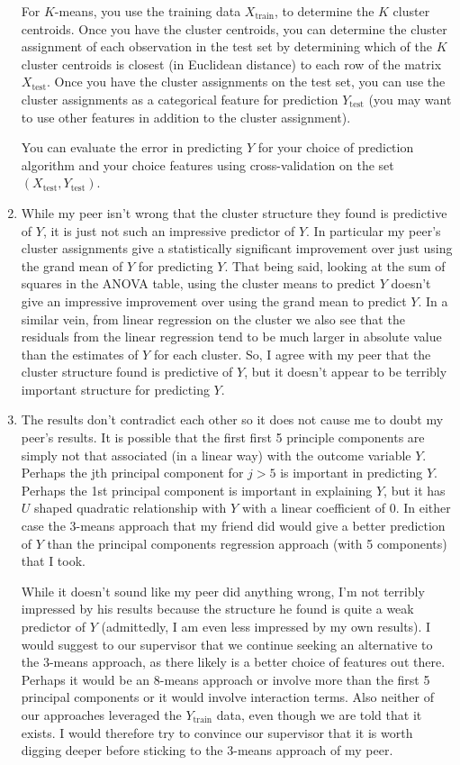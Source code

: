\begin{enumerate}[label=(\alph*)]
For $K$-means, you use the training data $X_{\text{train}}$, to determine the $K$ cluster centroids. Once you have the cluster centroids, you can determine the cluster assignment of each observation in the test set by determining which of the $K$ cluster centroids is closest (in Euclidean distance) to each row of the matrix $X_{\text{test}}$. Once you have the cluster assignments on the test set, you can use the cluster assignments as a categorical feature for prediction $Y_{\text{test}}$ (you may want to use other features in addition to the cluster assignment). 


You can evaluate the error in predicting $Y$ for your choice of prediction algorithm and your choice features using cross-validation on the set $(X_{\text{test}}, Y_{\text{test}})$.


\item While my peer isn't wrong that the cluster structure they found is predictive of $Y$, it is just not such an impressive predictor of $Y$. In particular my peer's cluster assignments give a statistically significant improvement over just using the grand mean of $Y$ for predicting $Y$. That being said, looking at the sum of squares in the ANOVA table, using the cluster means to predict $Y$ doesn't give an impressive improvement over using the grand mean to predict $Y$. In a similar vein, from linear regression on the cluster we also see that the residuals from the linear regression tend to be much larger in absolute value than the estimates of $Y$ for each cluster. So, I agree with my peer that the cluster structure found is predictive of $Y$, but it doesn't appear to be terribly important structure for predicting $Y$.

\item The results don't contradict each other so it does not cause me to doubt my peer's results. It is possible that the first first 5 principle components are simply not that associated (in a linear way) with the outcome variable $Y$. Perhaps the jth principal component for $j>5$ is important in predicting $Y$. Perhaps the 1st principal component is important in explaining $Y$, but it has $U$ shaped quadratic relationship with $Y$ with a linear coefficient of $0$. In either case the 3-means approach that my friend did would give a better prediction of $Y$ than the principal components regression approach (with 5 components) that I took.

While it doesn't sound like my peer did anything wrong, I'm not terribly impressed by his results because the structure he found is quite a weak predictor of $Y$ (admittedly, I am even less impressed by my own results). I would suggest to our supervisor that we continue seeking an alternative to the 3-means approach, as there likely is a better choice of features out there. Perhaps it would be an 8-means approach or involve more than the first 5 principal components or it would involve interaction terms. Also neither of our approaches leveraged the $Y_{\text{train}}$ data, even though we are told that it exists. I would therefore try to convince our supervisor that it is worth digging deeper before sticking to the 3-means approach of my peer.
\end{enumerate}


